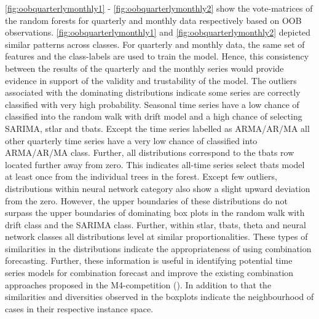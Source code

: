 \documentclass[11pt,a4paper,]{article}
\begin{document}
\autoref{fig:oobquarterlymonthly1} - \autoref{fig:oobquarterlymonthly2}
show the vote-matrices of the random forests for quarterly and monthly
data respectively based on OOB observations.
\autoref{fig:oobquarterlymonthly1} and
\autoref{fig:oobquarterlymonthly2} depicted similar patterns across
classes. For quarterly and monthly data, the same set of features and
the class-labels are used to train the model. Hence, this consistency
between the results of the quarterly and the monthly series would
provide evidence in support of the validity and trustability of the
model. The outliers associated with the dominating distributions
indicate some series are correctly classified with very high
probability. Seasonal time series have a low chance of classified into
the random walk with drift model and a high chance of selecting SARIMA,
stlar and tbats. Except the time series labelled as ARMA/AR/MA all other
quarterly time series have a very low chance of classified into
ARMA/AR/MA class. Further, all distributions correspond to the tbats row
located further away from zero. This indicates all-time series select
tbats model at least once from the individual trees in the forest.
Except few outliers, distributions within neural network category also
show a slight upward deviation from the zero. However, the upper
boundaries of these distributions do not surpass the upper boundaries of
dominating box plots in the random walk with drift class and the SARIMA
class. Further, within stlar, tbats, theta and neural network classes
all distributions level at similar proportionalities. These types of
similarities in the distributions indicate the appropriateness of using
combination forecasting. Further, these information is useful in
identifying potential time series models for combination forecast and
improve the existing combination approaches proposed in the
M4-competition (\textcite{Makridakis2018dx}). In addition to that the
similarities and diversities observed in the boxplots indicate the
neighbourhood of cases in their respective instance space.
\end{document}
